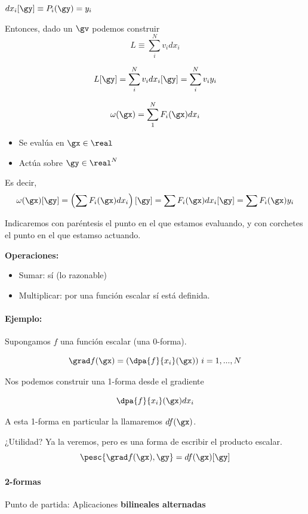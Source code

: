 $dx_i[\gy] \equiv P_i(\gy) = y_i$

Entonces, dado un $\gv$ podemos construir
\[L \equiv \sum_i^N v_idx_i\]

\[L[\gy] = \sum_i^N v_idx_i[\gy] = \sum_i^N v_iy_i\]

\begin{defn}[1-forma]
\[\omega(\gx)= \sum_1^N F_i(\gx) dx_i\]

\begin{itemize}
\item Se evalúa en $\gx\in\real$
\item Actúa sobre $\gy\in\real^N$
\end{itemize}

Es decir, \[\omega(\gx)[\gy] = \left(\sum F_i(\gx)dx_i\right)[\gy] = \sum F_i(\gx)dx_i[\gy] = \sum F_i(\gx)y_i\]
\end{defn}

Indicaremos con paréntesis el punto en el que estamos evaluando, y con corchetes el punto en el que estamso actuando.

\textbf{Operaciones:}
\begin{itemize}
\item Sumar: sí (lo razonable)
\item Multiplicar: por una función escalar sí está definida.
\end{itemize}


\paragraph{Ejemplo:}

Supongamos $f$ una función escalar (una 0-forma).

\[\grad f(\gx) = \left( \dpa{f}{x_i}(\gx)\right)\, i=1,...,N\]

Nos podemos construir una 1-forma desde el gradiente

\[\dpa{f}{x_i}(\gx)dx_i \]

A esta 1-forma en particular la llamaremos $df(\gx)$.

¿Utilidad? Ya la veremos, pero es una forma de escribir el producto escalar.
\[\pesc{\grad f(\gx),\gy} = df(\gx)[\gy]\]


\paragraph{2-formas}

Punto de partida: Aplicaciones \textbf{bilineales alternadas}

